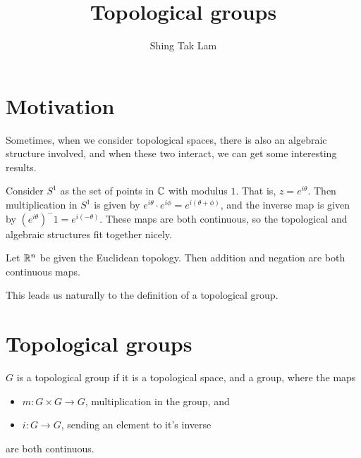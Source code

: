 \documentclass{article}
\title{Topological groups}
\author{Shing Tak Lam}
\begin{document}
    \maketitle

    \section{Motivation}

    Sometimes, when we consider topological spaces, there is also an algebraic structure involved, and when these two interact, we can get some interesting results.

    \begin{example}
        [Circle]

    Consider $S^1$ as the set of points in $\mathbb{C}$ with modulus $1$. That is, $z = e^{i\theta}$. Then multiplication in $S^1$ is given by $e^{i\theta} \cdot e^{i\phi} = e^{i(\theta + \phi)}$, and the inverse map is given by $(e^{i\theta})^-1 = e^{i(-\theta)}$. These maps are both continuous, so the topological and algebraic structures fit together nicely.
    \end{example}

    \begin{example}

        Let $\mathbb{R}^n$ be given the Euclidean topology. Then addition and negation are both continuous maps.
    \end{example}

    This leads us naturally to the definition of a topological group.

    \section{Topological groups}

    \begin{definition}

        $G$ is a topological group if it is a topological space, and a group, where the maps

        \begin{itemize}
            \item $m : G \times G \to G$, multiplication in the group, and
            \item $i : G \to G$, sending an element to it's inverse 
        \end{itemize}

        are both continuous.
    \end{definition}
\end{document}
